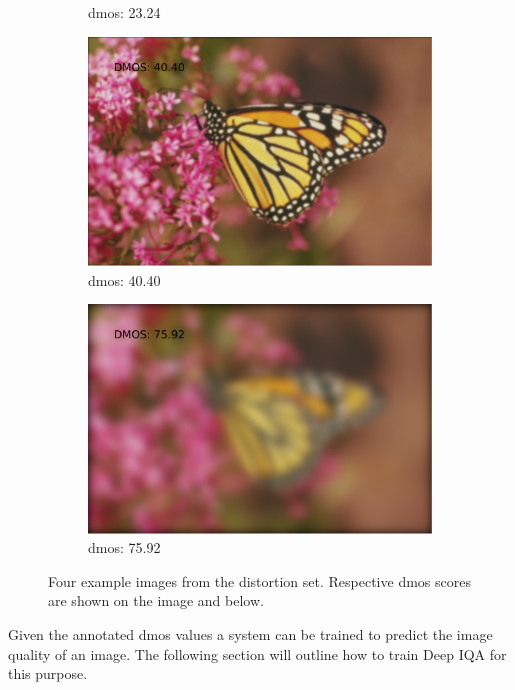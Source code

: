 \begin{figure}[H]
\begin{subfigure}[b]{0.4\textwidth}
        \caption{\gls{dmos}: 23.24}\label{fig:}
    \end{subfigure}
    \begin{subfigure}[b]{0.4\textwidth}
        \center
        \includegraphics[width=\textwidth]{Figs/Implementation/img103.pdf}
        \caption{\gls{dmos}: 40.40}\label{fig:}
    \end{subfigure}
    \begin{subfigure}[b]{0.4\textwidth}
	    \center
	    \includegraphics[width=\textwidth]{Figs/Implementation/img11.pdf}
	    \caption{\gls{dmos}: 75.92}\label{fig:}
    \end{subfigure}
    \caption{Four example images from the distortion set. Respective \gls{dmos} scores are shown on the image and below.}
    \label{fig:gb_ex}
\end{figure} 

Given the annotated \gls{dmos} values a system can be trained to predict the image quality of an image. The following section will outline how to train Deep IQA for this purpose.

